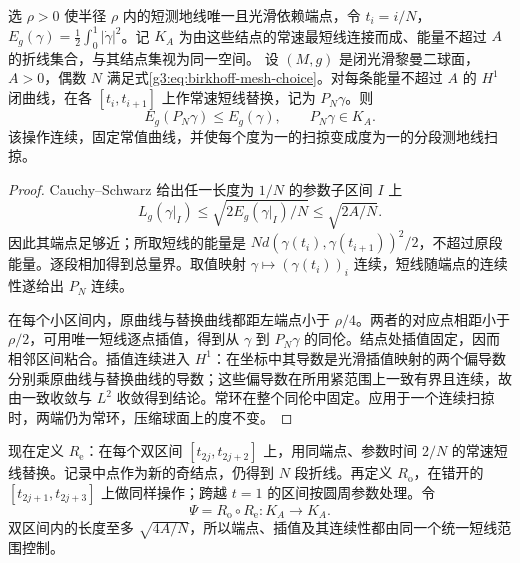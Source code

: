 \begin{lemma}\label{g3:lem:birkhoff-polygon-replacement}
	选 \(\rho>0\) 使半径 \(\rho\) 内的短测地线唯一且光滑依赖端点，令 \(t_i=i/N\)，\(E_g(\gamma)=\tfrac12\int_0^1|\dot\gamma|^2\)。记 \(K_A\) 为由这些结点的常速最短线连接而成、能量不超过 \(A\) 的折线集合，与其结点集视为同一空间。
	设 \((M,g)\) 是闭光滑黎曼二球面，\(A>0\)，偶数 \(N\) 满足式\eqref{g3:eq:birkhoff-mesh-choice}。对每条能量不超过 \(A\) 的 \(H^1\) 闭曲线，在各 \([t_i,t_{i+1}]\) 上作常速短线替换，记为 \(P_N\gamma\)。则
	\[
		E_g(P_N\gamma)\le E_g(\gamma),\qquad P_N\gamma\in K_A.
	\]
	该操作连续，固定常值曲线，并使每个度为一的扫掠变成度为一的分段测地线扫掠。
\end{lemma}
\begin{proof}
	Cauchy--Schwarz 给出任一长度为 \(1/N\) 的参数子区间 \(I\) 上
	\[
		L_g(\gamma|_I)\le\sqrt{2E_g(\gamma|_I)/N}\le\sqrt{2A/N}.
	\]
	因此其端点足够近；所取短线的能量是 \(Nd(\gamma(t_i),\gamma(t_{i+1}))^2/2\)，不超过原段能量。逐段相加得到总量界。取值映射 \(\gamma\mapsto(\gamma(t_i))_i\) 连续，短线随端点的连续性遂给出 \(P_N\) 连续。

	在每个小区间内，原曲线与替换曲线都距左端点小于 \(\rho/4\)。两者的对应点相距小于 \(\rho/2\)，可用唯一短线逐点插值，得到从 \(\gamma\) 到 \(P_N\gamma\) 的同伦。结点处插值固定，因而相邻区间粘合。插值连续进入 \(H^1\)：在坐标中其导数是光滑插值映射的两个偏导数分别乘原曲线与替换曲线的导数；这些偏导数在所用紧范围上一致有界且连续，故由一致收敛与 \(L^2\) 收敛得到结论。常环在整个同伦中固定。应用于一个连续扫掠时，两端仍为常环，压缩球面上的度不变。
\end{proof}

现在定义 \(R_{\mathrm e}\)：在每个双区间 \([t_{2j},t_{2j+2}]\) 上，用同端点、参数时间 \(2/N\) 的常速短线替换。记录中点作为新的奇结点，仍得到 \(N\) 段折线。再定义 \(R_{\mathrm o}\)，在错开的 \([t_{2j+1},t_{2j+3}]\) 上做同样操作；跨越 \(t=1\) 的区间按圆周参数处理。令
\begin{equation}\label{g3:eq:birkhoff-shortening-map}
	\Psi=R_{\mathrm o}\circ R_{\mathrm e}:K_A\longrightarrow K_A.
\end{equation}
双区间内的长度至多 \(\sqrt{4A/N}\)，所以端点、插值及其连续性都由同一个统一短线范围控制。

